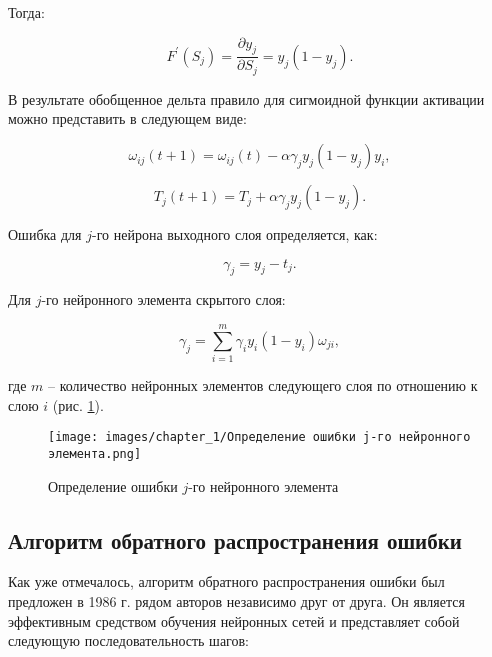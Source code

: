 Тогда:

\begin{equation}
    F^\prime(S_j) = \frac{\partial y_j}{\partial S_j} = y_j(1 - y_j).
\end{equation}

В результате обобщенное дельта правило для сигмоидной функции активации можно представить в следующем виде:

\begin{equation}
    \omega_{i j}(t + 1) = \omega_{i j}(t) - \alpha\gamma_j y_j (1 - y_j) y_i,
\end{equation}

\begin{equation}
    T_j(t + 1) = T_j + \alpha\gamma_j y_j(1 - y_j).
\end{equation}

Ошибка для $j$-го нейрона выходного слоя определяется, как:

\begin{equation}
    \gamma_j = y_j - t_j.
\end{equation}

Для $j$-го нейронного элемента скрытого слоя:

\begin{equation}
    \gamma_j = \sum_{i = 1}^{m}{\gamma_i y_i(1 - y_i)\omega_{j i},}
\end{equation}

где $m$ – количество нейронных элементов следующего слоя по отношению к слою $i$ (рис. \ref{fig:neuron_error}).

\begin{figure}[H]
    \centering
    \texttt{[image: images/chapter\_1/Определение ошибки j-го нейронного элемента.png]}
    \caption{Определение ошибки $j$-го нейронного элемента}
    \label{fig:neuron_error}
\end{figure}

\subsection{Алгоритм обратного распространения ошибки}

Как уже отмечалось, алгоритм обратного распространения ошибки был предложен в 1986 г. рядом авторов независимо друг от друга. Он является эффективным средством обучения нейронных сетей и представляет собой следующую последовательность шагов:

